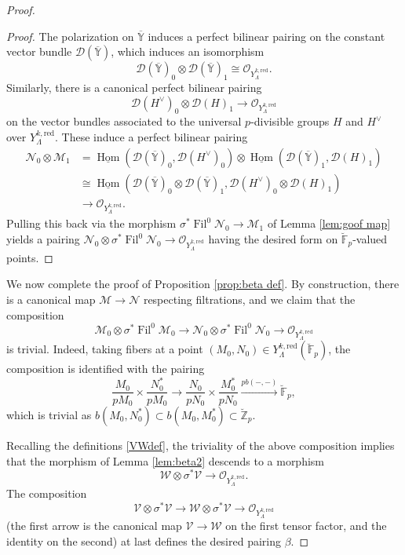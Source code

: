 \documentclass[10pt,a4paper]{amsart}
\newcommand{\F}{\mathbb F}
\DeclareMathOperator{\Fil}{Fil}
\DeclareMathOperator{\Hom}{Hom}
\newcommand{\Z}{\mathbb Z}
\newcommand{\co}{\mathcal O}
\newcommand{\iso}{\cong}
\newcommand{\map}[1]{\xrightarrow{#1}}
\newcommand{\red}{\mathrm{red}}
\begin{document}
\begin{proof}
\begin{proof}
The polarization on  $\overline{\mathbb{Y}}$ induces  a perfect bilinear pairing on the constant vector bundle $\mathcal{D}(\overline{\mathbb{Y}})$, which induces an isomorphism
\[
\mathcal{D}(\overline{\mathbb{Y}})_0 \otimes  \mathcal{D}(\overline{\mathbb{Y}})_1 \iso  \co_{Y^{k,\red}_\Lambda}.
\]
Similarly, there is a  canonical perfect bilinear pairing
\[
\mathcal{D}( H^\vee )_0 \otimes \mathcal{D}(H)_1 \to   \co_{Y^{k,\red}_\Lambda}
\]
on the vector bundles associated to the universal $p$-divisible groups $H$ and $H^\vee$ over $Y^{k,\red}_\Lambda$.  
These induce a perfect bilinear pairing
\begin{align*}
\mathscr{N}_0  \otimes  \mathscr{M}_1
& =  \underline{\Hom}( \mathcal{D}(\overline{\mathbb{Y}})_0 , \mathcal{D}(H^\vee)_0) 
\otimes \underline{\Hom}( \mathcal{D}(\overline{\mathbb{Y}})_1 , \mathcal{D}(H)_1)  \\
& \iso  \underline{\Hom}( \mathcal{D}(\overline{\mathbb{Y}})_0 \otimes \mathcal{D}(\overline{\mathbb{Y}})_1 , \mathcal{D}(H^\vee)_0 \otimes  \mathcal{D}(H)_1)  \\
& \to \co_{Y^{k,\red}_\Lambda}.
\end{align*}
Pulling this  back via the morphism $\sigma^*\Fil^0 \mathscr{N}_0 \to \mathscr{M}_1$ of Lemma \ref{lem:goof map} yields a pairing $\mathscr{N}_0 \otimes \sigma^* \Fil^0 \mathscr{N}_0 \to \co_{Y^{k,\red}_\Lambda}$ having the desired form on  $\breve{\F}_p$-valued points.
\end{proof}


We  now complete the proof of Proposition \ref{prop:beta def}. 
By construction, there is a canonical map $\mathscr{M} \to \mathscr{N}$ respecting filtrations, and we claim that the  composition 
\[
\mathscr{M}_0 \otimes \sigma^* \Fil^0 \mathscr{M}_0 \to \mathscr{N}_0 \otimes \sigma^* \Fil^0 \mathscr{N}_0 \to \co_{Y^{k,\red}_\Lambda}
\]
is trivial. Indeed, taking  fibers  at a point $(M_0,N_0) \in Y_\Lambda^{k,\red}(\breve{\F}_p)$,  the composition is identified with the pairing
\[
\frac{M_0}{pM_0} \times \frac{N_0^*}{pM_0} \to  \frac{N_0}{pN_0} \times \frac{M_0^*}{pN_0}
 \map{pb( - , - )} \breve{\F}_p,
\]
which is trivial as
$
b(M_0,N_0^*) \subset b(M_0,M_0^*) \subset \breve{\Z}_p.
$


Recalling the definitions \eqref{VWdef}, the triviality of the above composition implies that  the morphism of Lemma \ref{lem:beta2}  descends to a morphism
\[
\mathscr{W} \otimes \sigma^* \mathscr{V} \to \co_{Y^{k,\red}_\Lambda}.
\]
The composition
\[
\mathscr{V} \otimes \sigma^*\mathscr{V} \to \mathscr{W} \otimes \sigma^*\mathscr{V} \to \co_{Y_\Lambda^{k,\red}}
\]
(the first arrow is the canonical map $\mathscr{V} \to \mathscr{W}$ on the first tensor factor, and the identity on the second)  
at last defines the desired pairing $\beta$. 
\end{proof}
\end{document}
